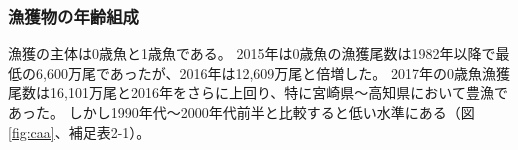 \subsubsection{漁獲物の年齢組成}
漁獲の主体は0歳魚と1歳魚である。
2015年は0歳魚の漁獲尾数は1982年以降で最低の6,600万尾であったが、2016年は12,609万尾と倍増した。
2017年の0歳魚漁獲尾数は16,101万尾と2016年をさらに上回り、特に宮崎県～高知県において豊漁であった。
しかし1990年代～2000年代前半と比較すると低い水準にある（図\ref{fig:caa}、補足表2-1）。

